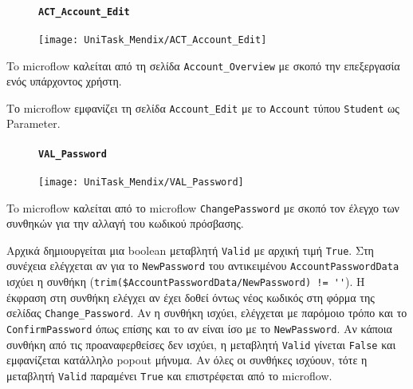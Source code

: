                 \begin{figure}[H] \noindent
                    \paragraph{\texttt{ACT\_Account\_Edit}}
                    \begin{center}
                        \texttt{[image: UniTask\_Mendix/ACT\_Account\_Edit]}
                    \end{center}
                \end{figure}

                    To microflow καλείται από τη σελίδα \texttt{Account\_Overview} με σκοπό την επεξεργασία ενός υπάρχοντος χρήστη.

                    Το microflow εμφανίζει τη σελίδα \texttt{Account\_Edit} με το \texttt{Account} τύπου \texttt{Student} ως Parameter.

                \begin{figure}[H] \noindent
                    \paragraph{\texttt{VAL\_Password}}
                    \begin{center}
                        \texttt{[image: UniTask\_Mendix/VAL\_Password]}
                    \end{center}
                \end{figure}

                    To microflow καλείται από το microflow \texttt{ChangePassword} με σκοπό τον έλεγχο των συνθηκών για την αλλαγή του κωδικού πρόσβασης.

                    Αρχικά δημιουργείται μια boolean μεταβλητή \texttt{Valid} με αρχική τιμή \texttt{True}. Στη συνέχεια ελέγχεται αν για το \texttt{NewPassword} του αντικειμένου \texttt{AccountPasswordData} ισχύει η συνθήκη (\verb|trim($AccountPasswordData/NewPassword) != ''|). Η έκφραση στη συνθήκη ελέγχει αν έχει δοθεί όντως νέος κωδικός στη φόρμα της σελίδας \texttt{Change\_Password}. Αν η συνθήκη ισχύει, ελέγχεται με παρόμοιο τρόπο και το \texttt{ConfirmPassword} όπως επίσης και το αν είναι ίσο με το \texttt{NewPassword}. Αν κάποια συνθήκη από τις προαναφερθείσες δεν ισχύει, η μεταβλητή \texttt{Valid} γίνεται \texttt{False} και εμφανίζεται κατάλληλο popout μήνυμα. Αν όλες οι συνθήκες ισχύουν, τότε η μεταβλητή \texttt{Valid} παραμένει \texttt{True} και επιστρέφεται από το microflow.

